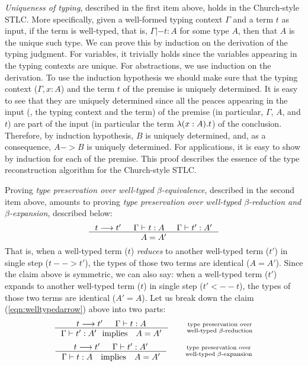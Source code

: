 \emph{Uniqueness of typing}, described in the first item above,
holds in the Church-style STLC.  More specifically, given
a well-formed typing context $\Gamma$ and a term $t$ as input,
if the term is well-typed, that is, $\Gamma |- t : A$ for some type $A$,
then that $A$ is the unique such type. We can prove this by induction on
the derivation of the typing judgment.
For variables, it trivially holds since the variables appearing in
the typing contexts are unique.
For abstractions, we use induction on the derivation.
To use the induction hypothesis we should make sure that
the typing context ($\Gamma,x:A$) and the term $t$ of the premise
is uniquely determined. It is easy to see that they are uniquely determined
since all the peaces appearing in the input (\ie, the typing context and
the term) of the premise (in particular, $\Gamma$, $A$, and $t$) are
part of the input (in particular the term $\lambda(x:A).t$) of the conclusion.
Therefore, by induction hypothesis, $B$ is uniquely determined, and,
as a consequence, $A -> B$ is uniquely determined.
For applications, it is easy to show by induction for each of the premise.
This proof describes the essence of the type reconstruction algorithm for
the Church-style STLC.

Proving \emph{type preservation over well-typed $\beta$-equivalence},
described in the second item above, amounts to proving
\emph{type preservation over well-typed
$\beta$-reduction and $\beta$-expansion}, described below:
\begin{align}
\inference{t --> t' & \Gamma |- t : A & \Gamma |- t' : A'}{A = A'}
	\label{eqn:welltypedarrow}
\end{align}
That is, when a well-typed term ($t$) \emph{reduces} to
another well-typed term ($t'$) in single step ($t --> t'$),
the types of those two terms are identical ($A=A'$).
Since the claim above is symmetric, we can also say: when a well-typed term
($t'$) expands to another well-typed term ($t$) in single step ($t' <-- t$),
the types of those two terms are identical ($A'=A$).
Let us break down the claim (\ref{eqn:welltypedarrow}) above into two parts:
\[
\inference{t --> t' & \Gamma |- t : A}
          {\Gamma |- t' : A' ~~\text{implies}\quad A = A'} \qquad
	\begin{smallmatrix}
		\text{type preservation over} \\
  		\text{well-typed $\beta$-reduction}
	\end{smallmatrix}
\]
\[
\inference{t --> t' & \Gamma |- t' : A'}
          {\Gamma |- t : A \quad\text{implies}\quad A = A'} \qquad
	\begin{smallmatrix}
		\text{type preservation over} \\
  		\text{well-typed $\beta$-expansion}
	\end{smallmatrix}
\]~\vspace*{-3em}\\

